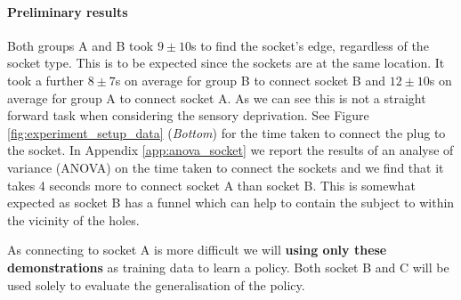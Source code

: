 

\paragraph{Preliminary results}

Both groups A and B took $9\pm10$s to find the socket's edge, regardless of the socket type. This is to be expected since the sockets 
are at the same location. It took a further $8\pm7$s on average for group B to connect
socket B and $12\pm10$s on average for group A to connect socket A. As we can see this is not a straight forward task when considering
the sensory deprivation. See Figure \ref{fig:experiment_setup_data} (\textit{Bottom}) for the time taken to connect the plug to the socket.
In Appendix \ref{app:anova_socket} we report the results of an analyse of variance (ANOVA) on the time taken to connect
the sockets and we find that it takes 4 seconds more to connect socket A than socket B. This is somewhat expected as 
socket B has a funnel which can help to contain the subject to within the vicinity of the holes.

As connecting to socket A is more difficult we will \textbf{using only these demonstrations} as training data to learn a policy. Both
socket B and C will be used solely to evaluate the generalisation of the policy.

